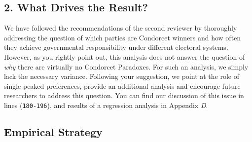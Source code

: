 \documentclass[a4paper, 12pt]{scrartcl}
\begin{document}
\subsection*{2. What Drives the Result?}
We have followed the recommendations of the second reviewer by thoroughly addressing the question of which parties are Condorcet winners and how often they achieve governmental responsibility under different electoral systems. However, as you rightly point out, this analysis does not answer the question of \textit{why} there are virtually no Condorcet Paradoxes. For such an analysis, we simply lack the necessary variance. Following your suggestion, we point at the role of single-peaked preferences, provide an additional analysis and encourage future researchers to address this question. You can find our discussion of this issue in lines (\texttt{180-196}), and results of a regression analysis in Appendix \textit{D}.

\subsection*{Empirical Strategy}
\end{document}
